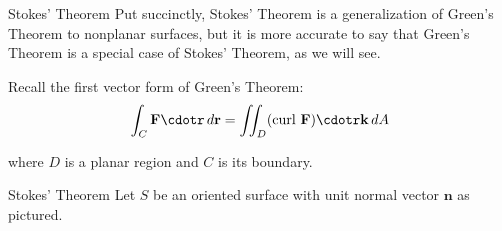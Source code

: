 \documentclass[11pt,english,
handout
]{beamer}
\begin{document}


\makebeamertitle












\begin{frame}[t]{Stokes' Theorem}
\small
Put succinctly, Stokes' Theorem is a generalization of Green's Theorem to nonplanar surfaces, but it is more accurate to say that Green's Theorem is a special case of Stokes' Theorem, as we will see. \pause

\lspace
Recall the first vector form of Green's Theorem:
\[
\int_C\mathbf{F}\cdotr\,d\mathbf{r}=\iint_D(\text{curl }\mathbf{F})\cdotr\mathbf{k}\,dA
\]

where $D$ is a planar region and $C$ is its boundary.
\end{frame}




















\begin{frame}[t]{Stokes' Theorem}
\small
Let $S$ be an oriented surface with unit normal vector $\mathbf{n}$ as pictured.  

\end{frame}
\end{document}
